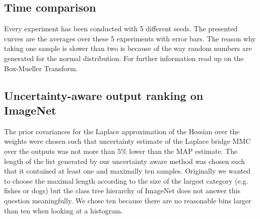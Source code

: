 \subsection*{Time comparison}

Every experiment has been conducted with 5 different seeds. The presented curves are the averages over these 5 experiments with error bars. The reason why taking one sample is slower than two is because of the way random numbers are generated for the normal distribution. For further information read up on the Box-Mueller Transform. 

\subsection*{Uncertainty-aware output ranking on ImageNet}

The prior covariances for the Laplace approximation of the Hessian over the weights were chosen such that uncertainty estimate of the Laplace bridge MMC over the outputs was not more than 5\% lower than the MAP estimate. The length of the list generated by our uncertainty aware method was chosen such that it contained at least one and maximally ten samples. Originally we wanted to choose the maximal length according to the size of the largest category (e.g. fishes or dogs) but the class tree hierarchy of ImageNet does not answer this question meaningfully. We chose ten because there are no reasonable bins larger than ten when looking at a histogram. 

